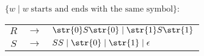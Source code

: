 $\{w \mid w \; \text{starts and ends with the same symbol} \}$: \par
\begin{tabular}{ccl}
	$R$ & $\rightarrow$ & $\str{0}S\str{0} \mid \str{1}S\str{1}$ \\
	$S$ & $\rightarrow$ & $SS \mid \str{0} \mid \str{1} \mid \epsilon$ \\
\end{tabular}